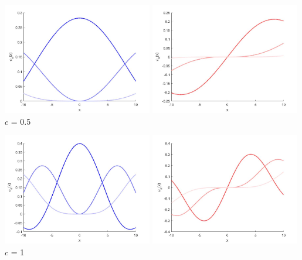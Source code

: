 \documentclass[a4paper,10pt]{article}
\begin{document}
\begin{center}
\includegraphics[width=0.49\textwidth]{"c0.5_e.jpg"}
\includegraphics[width=0.49\textwidth]{"c0.5_o.jpg"}
\small{$c$ = 0.5}

\includegraphics[width=0.49\textwidth]{"c1_e.jpg"}
\includegraphics[width=0.49\textwidth]{"c1_o.jpg"}
\small{$c$ = 1}


\end{center}
\end{document}
